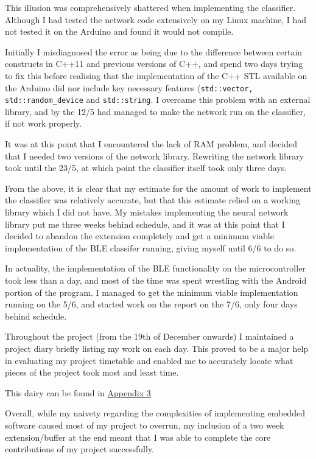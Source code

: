 \documentclass[a4paper]{article}
\begin{document}
This illusion was comprehensively shattered when implementing the classifier. Although I had tested the network code extensively on my Linux machine, I had not tested it on the Arduino and found it would not compile.

Initially I misdiagnosed the error as being due to the difference between certain constructs in C++11 and previous versions of C++, and spend two days trying to fix this before realising that the implementation of the C++ STL available on the Arduino did nor include key necessary features (\lstinline{std::vector, std::random_device} and \lstinline{std::string}. I overcame this problem with an external library, and by the 12/5 had managed to make the network run on the classifier, if not work properly.

It was at this point that I encountered the lack of RAM problem, and decided that I needed two versions of the network library. Rewriting the network library took until the 23/5, at which point the classifier itself took only three days. 

From the above, it is clear that my estimate for the amount of work to implement the classifier was relatively accurate, but that this estimate relied on a working library which I did not have. My mistakes implementing the neural network library put me three weeks behind schedule, and it was at this point that I decided to abandon the extension completely and get a minimum viable implementation of the BLE classifer running, giving myself until 6/6 to do so.

In actuality, the implementation of the BLE functionality on the microcontroller took less than a day, and most of the time was spent wrestling with the Android portion of the program. I managed to get the minimum viable implementation running on the 5/6, and started work on the report on the 7/6, only four days behind schedule.


Throughout the project (from the 19th of December onwards) I maintained a project diary briefly listing my work on each day. This proved to be a major help in evaluating my project timetable and enabled me to accurately locate what pieces of the project took most and least time.

This dairy can be found in \hyperref[subsec:a3_pd]{Appendix 3}

Overall, while my naivety regarding the complexities of implementing embedded software caused most of my project to overrun, my inclusion of a two week extension/buffer at the end meant that I was able to complete the core contributions of my project successfully. 
\end{document}
